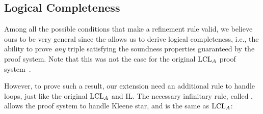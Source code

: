 \subsection{Logical Completeness}\label{sec:logical-completeness}
Among all the possible conditions that make a refinement rule valid, we believe ours to be very general since the  allows us to derive logical completeness, i.e., the ability to prove \emph{any} triple satisfying the soundness properties guaranteed by the proof system. Note that this was not the case for the original $\text{LCL}_A$ proof system~\cite[§5.2]{BGGR21}.

However, to prove such a result, our extension need an additional rule to handle loops, just like the original $\text{LCL}_A$ and IL.
The necessary infinitary rule, called , allows the proof system to handle Kleene star, and is the same as $\text{LCL}_A$:

